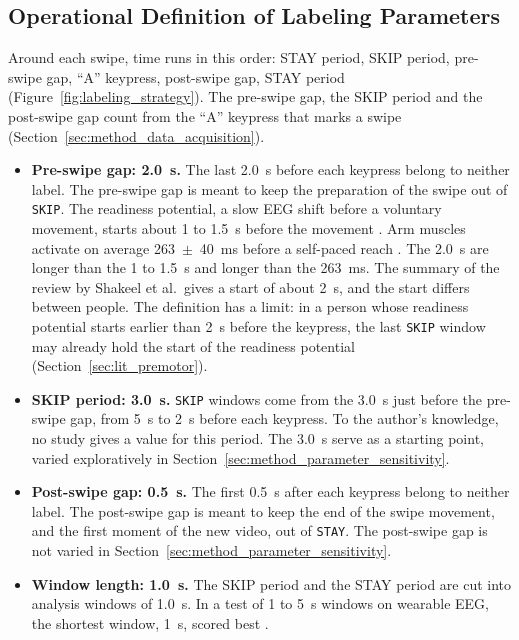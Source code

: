 \documentclass[12pt,a4paper]{report}
\begin{document}
\subsection{Operational Definition of Labeling Parameters}
\label{sec:op_labeling_params}
Around each swipe, time runs in this order: STAY period, SKIP period, pre-swipe gap, ``A'' keypress, post-swipe gap, STAY period (Figure~\ref{fig:labeling_strategy}). The pre-swipe gap, the SKIP period and the post-swipe gap count from the ``A'' keypress that marks a swipe (Section~\ref{sec:method_data_acquisition}).

\begin{itemize}
    \item \textbf{Pre-swipe gap: 2.0~s.} The last 2.0~s before each keypress belong to neither label. The pre-swipe gap is meant to keep the preparation of the swipe out of \texttt{SKIP}. The readiness potential, a slow EEG shift before a voluntary movement, starts about 1 to 1.5~s before the movement \cite{shakeel_review_2015}. Arm muscles activate on average 263~$\pm$~40~ms before a self-paced reach \cite{lew_detection_2012}. The 2.0~s are longer than the 1 to 1.5~s and longer than the 263~ms. The summary of the review by Shakeel et al.\ gives a start of about 2~s, and the start differs between people. The definition has a limit: in a person whose readiness potential starts earlier than 2~s before the keypress, the last \texttt{SKIP} window may already hold the start of the readiness potential (Section~\ref{sec:lit_premotor}).
    \item \textbf{SKIP period: 3.0~s.} \texttt{SKIP} windows come from the 3.0~s just before the pre-swipe gap, from 5~s to 2~s before each keypress. To the author's knowledge, no study gives a value for this period. The 3.0~s serve as a starting point, varied exploratively in Section~\ref{sec:method_parameter_sensitivity}.
    \item \textbf{Post-swipe gap: 0.5~s.} The first 0.5~s after each keypress belong to neither label. The post-swipe gap is meant to keep the end of the swipe movement, and the first moment of the new video, out of \texttt{STAY}. The post-swipe gap is not varied in Section~\ref{sec:method_parameter_sensitivity}.
    \item \textbf{Window length: 1.0~s.} The SKIP period and the STAY period are cut into analysis windows of 1.0~s. In a test of 1 to 5~s windows on wearable EEG, the shortest window, 1~s, scored best \cite{moontaha_online_2023-1}.
\end{itemize}
\end{document}
